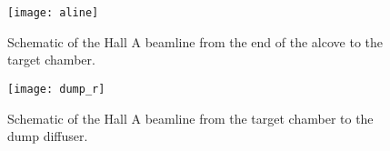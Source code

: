 \begin{figure}
\begin{center}
\texttt{[image: aline]}
\caption[Beamline: Hall A Beamline Overview]{Schematic of the Hall A beamline
from the end of the alcove to the target chamber.}
\label{fig:Aline2}
\end{center}
\end{figure}

\begin{figure}
\begin{center}
\texttt{[image: dump\_r]}
\caption[Beamline: Hall A Beamline Overview]{Schematic of the Hall A beamline
from the target chamber to the dump diffuser.}
\label{fig:Aline3}
\end{center}
\end{figure}

